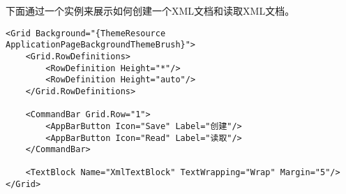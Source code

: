 下面通过一个实例来展示如何创建一个XML文档和读取XML文档。

\begin{lstlisting}[style=XamlStyle]
<Grid Background="{ThemeResource ApplicationPageBackgroundThemeBrush}">
	<Grid.RowDefinitions>
		<RowDefinition Height="*"/>
		<RowDefinition Height="auto"/>
	</Grid.RowDefinitions>

	<CommandBar Grid.Row="1">
		<AppBarButton Icon="Save" Label="创建"/>
		<AppBarButton Icon="Read" Label="读取"/>
	</CommandBar>

	<TextBlock Name="XmlTextBlock" TextWrapping="Wrap" Margin="5"/>
</Grid>
\end{lstlisting}
